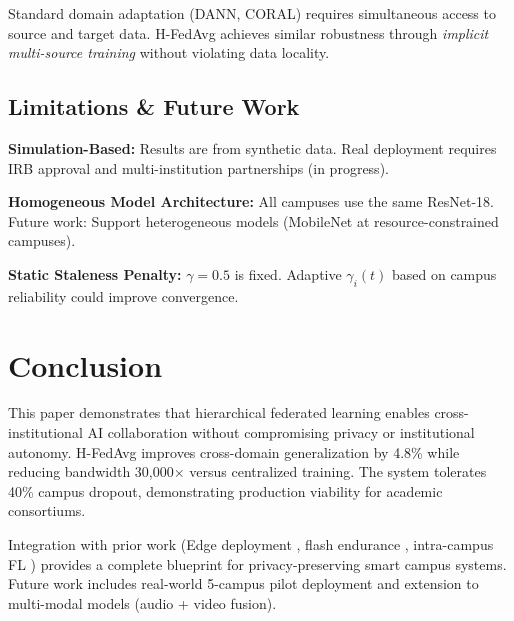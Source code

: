 \documentclass[conference]{IEEEtran}
\begin{document}
Standard domain adaptation (DANN, CORAL) requires simultaneous access to source and target data. H-FedAvg achieves similar robustness through \textit{implicit multi-source training} without violating data locality.

\subsection{Limitations \& Future Work}

\textbf{Simulation-Based:} Results are from synthetic data. Real deployment requires IRB approval and multi-institution partnerships (in progress).

\textbf{Homogeneous Model Architecture:} All campuses use the same ResNet-18. Future work: Support heterogeneous models (MobileNet at resource-constrained campuses).

\textbf{Static Staleness Penalty:} $\gamma = 0.5$ is fixed. Adaptive $\gamma_i(t)$ based on campus reliability could improve convergence.

\section{Conclusion}

This paper demonstrates that hierarchical federated learning enables cross-institutional AI collaboration without compromising privacy or institutional autonomy. H-FedAvg improves cross-domain generalization by 4.8\% while reducing bandwidth 30,000$\times$ versus centralized training. The system tolerates 40\% campus dropout, demonstrating production viability for academic consortiums.

Integration with prior work (Edge deployment \cite{paper11}, flash endurance \cite{paper12}, intra-campus FL \cite{paper13}) provides a complete blueprint for privacy-preserving smart campus systems. Future work includes real-world 5-campus pilot deployment and extension to multi-modal models (audio + video fusion).
\end{document}

